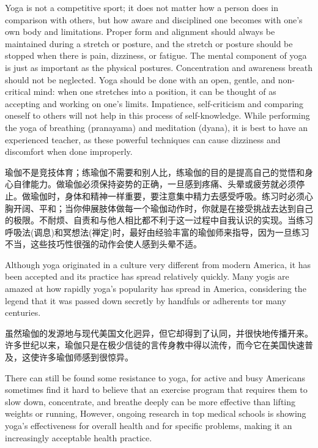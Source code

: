 \documentclass[cs4size, a4paper,12pt]{article}
\newcounter{numpar}
\newcommand*{\newpar}{\numpar{}}
\begin{document}
\newpar Yoga is not a competitive sport; it does not matter how a person does in comparison with others, but how aware and disciplined one becomes with one's own body and limitations. Proper form and alignment should always be maintained during a stretch or posture, and the stretch or posture should be stopped when there is pain, dizziness, or fatigue. The mental component of yoga is just as important as the physical postures. Concentration and awareness breath should not be neglected. Yoga should be done with an open, gentle, and non-critical mind: when one stretches into a position, it can be thought of as accepting and working on one's limits. Impatience, self-criticism and comparing oneself to others will not help in this process of self-knowledge. While performing the yoga of breathing (pranayama) and meditation (dyana), it is best to have an experienced teacher, as these powerful techniques can cause dizziness and discomfort when done improperly.

瑜伽不是竞技体育；练瑜伽不需要和别人比，练瑜伽的目的是提高自己的觉悟和身心自律能力。做瑜伽必须保持姿势的正确，一旦感到疼痛、头晕或疲劳就必须停止。做瑜伽时，身体和精神一样重要，要注意集中精力去感受呼吸。练习时必须心胸开阔、平和；当你伸展肢体做每一个瑜伽动作时，你就是在接受挑战去达到自己的极限。不耐烦、自责和与他人相比都不利于这一过程中自我认识的实现。当练习呼吸法(调息)和冥想法(禅定)时，最好由经验丰富的瑜伽师来指导，因为一旦练习不当，这些技巧性很强的动作会使人感到头晕不适。

\newpar Although yoga originated in a culture very different from modern America, it has been accepted and its practice has spread relatively quickly. Many yogis are amazed at how rapidly yoga's popularity has spread in America, considering the legend that it was passed down secretly by handfuls or adherents tor many centuries.

虽然瑜伽的发源地与现代美国文化迥异，但它却得到了认同，并很快地传播开来。许多世纪以来，瑜伽只是在极少信徒的言传身教中得以流传，而今它在美国快速普及，这使许多瑜伽师感到很惊异。

\newpar There can still be found some resistance to yoga, for active and busy Americans sometimes find it hard to believe that an exercise program that requires them to slow down, concentrate, and breathe deeply can be more effective than lifting weights or running, However, ongoing research in top medical schools is showing yoga's effectiveness for overall health and for specific problems, making it an increasingly acceptable health practice.
\end{document}
